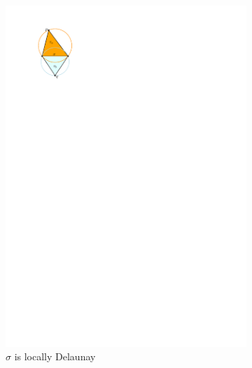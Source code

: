 \begin{figure}
	\centering
	\begin{subfigure}[b]{0.45\linewidth}
		\includegraphics[width=\textwidth,page=1]{figs/local}
		\caption{$\sigma$ is locally Delaunay}\label{fig:local:a}
	\end{subfigure}%
	\qquad
	\begin{subfigure}[b]{0.45\linewidth}

\end{subfigure}
\end{figure}
